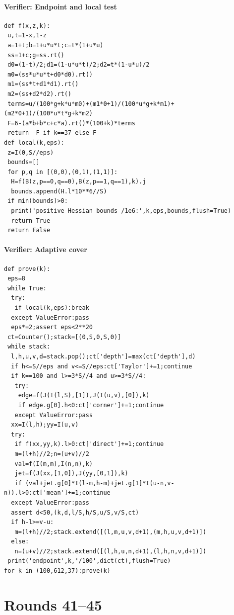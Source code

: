 \documentclass[11pt,a4paper]{article}
\numberwithin{equation}{section}
\theoremstyle{definition}
\theoremstyle{remark}
\begin{document}
\subsection*{Verifier: Endpoint and local test}
\scriptsize\begin{Verbatim}
def f(x,z,k):
 u,t=1-x,1-z
 a=1+t;b=1+u*u*t;c=t*(1+u*u)
 ss=1+c;g=ss.rt()
 d0=(1-t)/2;d1=(1-u*u*t)/2;d2=t*(1-u*u)/2
 m0=(ss*u*u*t+d0*d0).rt()
 m1=(ss*t+d1*d1).rt()
 m2=(ss+d2*d2).rt()
 terms=u/(100*g+k*u*m0)+(m1*0+1)/(100*u*g+k*m1)+(m2*0+1)/(100*u*t*g+k*m2)
 F=6-(a*b+b*c+c*a).rt()*(100+k)*terms
 return -F if k==37 else F
def local(k,eps):
 z=I(0,S//eps)
 bounds=[]
 for p,q in [(0,0),(0,1),(1,1)]:
  H=f(B(z,p==0,q==0),B(z,p==1,q==1),k).j
  bounds.append(H.l*10**6//S)
 if min(bounds)>0:
  print('positive Hessian bounds /1e6:',k,eps,bounds,flush=True)
  return True
 return False
\end{Verbatim}

\subsection*{Verifier: Adaptive cover}
\scriptsize\begin{Verbatim}
def prove(k):
 eps=8
 while True:
  try:
   if local(k,eps):break
  except ValueError:pass
  eps*=2;assert eps<2**20
 ct=Counter();stack=[(0,S,0,S,0)]
 while stack:
  l,h,u,v,d=stack.pop();ct['depth']=max(ct['depth'],d)
  if h<=S//eps and v<=S//eps:ct['Taylor']+=1;continue
  if k==100 and l>=3*S//4 and u>=3*S//4:
   try:
    edge=f(J(I(l,S),[1]),J(I(u,v),[0]),k)
    if edge.g[0].h<0:ct['corner']+=1;continue
   except ValueError:pass
  xx=I(l,h);yy=I(u,v)
  try:
   if f(xx,yy,k).l>0:ct['direct']+=1;continue
   m=(l+h)//2;n=(u+v)//2
   val=f(I(m,m),I(n,n),k)
   jet=f(J(xx,[1,0]),J(yy,[0,1]),k)
   if (val+jet.g[0]*I(l-m,h-m)+jet.g[1]*I(u-n,v-n)).l>0:ct['mean']+=1;continue
  except ValueError:pass
  assert d<50,(k,d,l/S,h/S,u/S,v/S,ct)
  if h-l>=v-u:
   m=(l+h)//2;stack.extend([(l,m,u,v,d+1),(m,h,u,v,d+1)])
  else:
   n=(u+v)//2;stack.extend([(l,h,u,n,d+1),(l,h,n,v,d+1)])
 print('endpoint',k,'/100',dict(ct),flush=True)
for k in (100,612,37):prove(k)
\end{Verbatim}


\par\endgroup
\clearpage
\part{Rounds 41--45}

\begingroup
\end{document}
